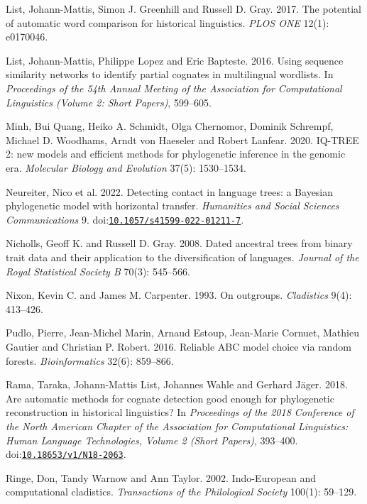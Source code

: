 \documentclass[11pt]{article}
\newcommand{\doi}[1]{doi:\href{https://doi.org/#1}{\nolinkurl{#1}}}
\begin{document}
\begin{thebibliography}{}
List, Johann-Mattis, Simon J. Greenhill and Russell D. Gray. 2017. The potential of automatic word comparison for historical linguistics. \emph{PLOS ONE} 12(1): e0170046.

List, Johann-Mattis, Philippe Lopez and Eric Bapteste. 2016. Using sequence similarity networks to identify partial cognates in multilingual wordlists. In \emph{Proceedings of the 54th Annual Meeting of the Association for Computational Linguistics (Volume 2: Short Papers)}, 599--605.

Minh, Bui Quang, Heiko A. Schmidt, Olga Chernomor, Dominik Schrempf, Michael D. Woodhams, Arndt von Haeseler and Robert Lanfear. 2020. IQ-TREE 2: new models and efficient methods for phylogenetic inference in the genomic era. \emph{Molecular Biology and Evolution} 37(5): 1530--1534.

Neureiter, Nico et al. 2022. Detecting contact in language trees: a Bayesian phylogenetic model with horizontal transfer. \emph{Humanities and Social Sciences Communications} 9. \doi{10.1057/s41599-022-01211-7}.

Nicholls, Geoff K. and Russell D. Gray. 2008. Dated ancestral trees from binary trait data and their application to the diversification of languages. \emph{Journal of the Royal Statistical Society B} 70(3): 545--566.

Nixon, Kevin C. and James M. Carpenter. 1993. On outgroups. \emph{Cladistics} 9(4): 413--426.

Pudlo, Pierre, Jean-Michel Marin, Arnaud Estoup, Jean-Marie Cornuet, Mathieu Gautier and Christian P. Robert. 2016. Reliable ABC model choice via random forests. \emph{Bioinformatics} 32(6): 859--866.

Rama, Taraka, Johann-Mattis List, Johannes Wahle and Gerhard Jäger. 2018. Are automatic methods for cognate detection good enough for phylogenetic reconstruction in historical linguistics? In \emph{Proceedings of the 2018 Conference of the North American Chapter of the Association for Computational Linguistics: Human Language Technologies, Volume 2 (Short Papers)}, 393--400. \doi{10.18653/v1/N18-2063}.

Ringe, Don, Tandy Warnow and Ann Taylor. 2002. Indo-European and computational cladistics. \emph{Transactions of the Philological Society} 100(1): 59--129.


\end{thebibliography}
\end{document}

